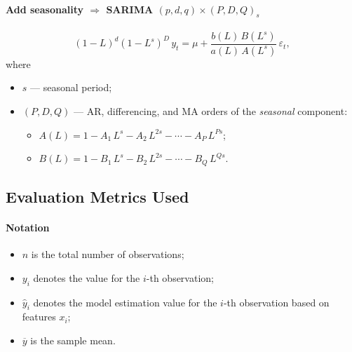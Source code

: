 \documentclass{article}
\begin{document}
\paragraph{Add seasonality \texorpdfstring{\(\Rightarrow\)}{--- get} SARIMA
    \texorpdfstring{\((p,d,q)\!\times\!(P,D,Q)_{s}\)}{(p,d,q) x (P,D,Q)\_s}}

\begin{equation}
    (1-L)^{d}(1-L^{s})^{D}\,y_{t} =
    \mu +
    \frac{b(L)\,B(L^{s})}{a(L)\,A(L^{s})}\,\varepsilon_{t},
\end{equation}
where
\begin{itemize}
    \item \(s\) — seasonal period;
    \item \((P,D,Q)\) — AR, differencing, and MA orders of the \emph{seasonal} component:
          \begin{itemize}
              \item \(A(L) = 1 - A_1\,L^{s} - A_2\,L^{2s} - \cdots - A_P\,L^{Ps}\);
              \item \(B(L) = 1 - B_1\,L^{s} - B_2\,L^{2s} - \cdots - B_Q\,L^{Qs}\).
          \end{itemize}
\end{itemize}



\subsection{Evaluation Metrics Used}

\paragraph{Notation}
\begin{itemize}
    \item \( n \) is the total number of observations;
    \item \( y_i \) denotes the value for the \( i \)-th observation;
    \item \( \widehat{y}_i \) denotes the model estimation value for the \( i \)-th observation based on features \( x_i \);
    \item \( \overline{y} \) is the sample mean.
\end{itemize}
\end{document}
